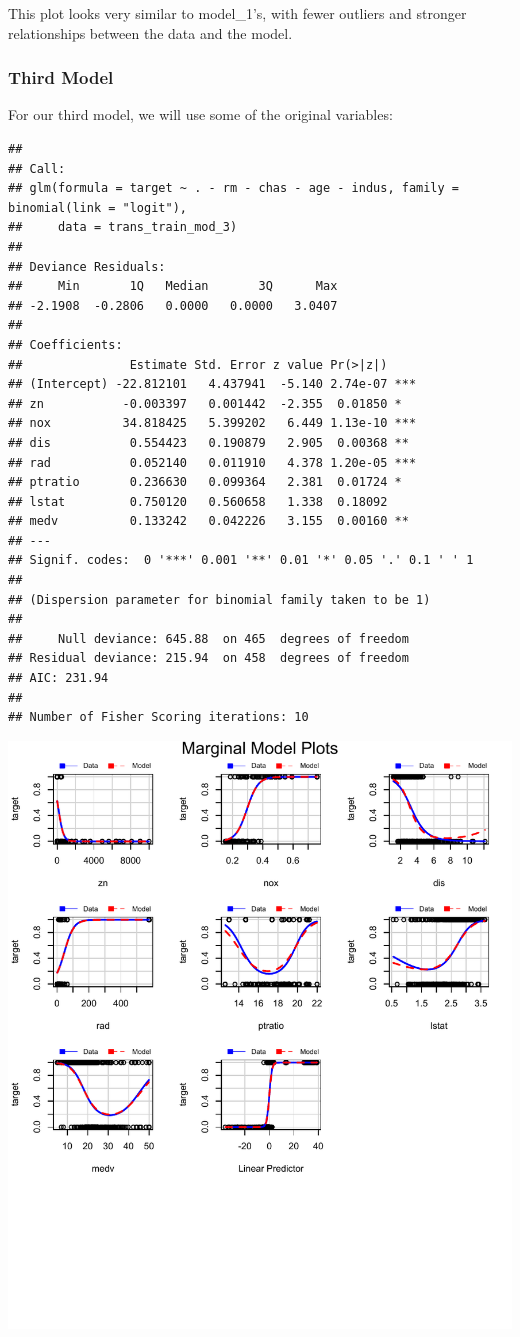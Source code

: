 \documentclass[3p]{elsarticle} %
\begin{document}
This plot looks very similar to model\_1's, with fewer outliers and
stronger relationships between the data and the model.

\newpage

\hypertarget{third-model}{%
\subsubsection{Third Model}\label{third-model}}

For our third model, we will use some of the original variables:

\begin{verbatim}
## 
## Call:
## glm(formula = target ~ . - rm - chas - age - indus, family = binomial(link = "logit"), 
##     data = trans_train_mod_3)
## 
## Deviance Residuals: 
##     Min       1Q   Median       3Q      Max  
## -2.1908  -0.2806   0.0000   0.0000   3.0407  
## 
## Coefficients:
##               Estimate Std. Error z value Pr(>|z|)    
## (Intercept) -22.812101   4.437941  -5.140 2.74e-07 ***
## zn           -0.003397   0.001442  -2.355  0.01850 *  
## nox          34.818425   5.399202   6.449 1.13e-10 ***
## dis           0.554423   0.190879   2.905  0.00368 ** 
## rad           0.052140   0.011910   4.378 1.20e-05 ***
## ptratio       0.236630   0.099364   2.381  0.01724 *  
## lstat         0.750120   0.560658   1.338  0.18092    
## medv          0.133242   0.042226   3.155  0.00160 ** 
## ---
## Signif. codes:  0 '***' 0.001 '**' 0.01 '*' 0.05 '.' 0.1 ' ' 1
## 
## (Dispersion parameter for binomial family taken to be 1)
## 
##     Null deviance: 645.88  on 465  degrees of freedom
## Residual deviance: 215.94  on 458  degrees of freedom
## AIC: 231.94
## 
## Number of Fisher Scoring iterations: 10
\end{verbatim}

\includegraphics{paper_files/figure-latex/unnamed-chunk-19-1.pdf}
\end{document}
